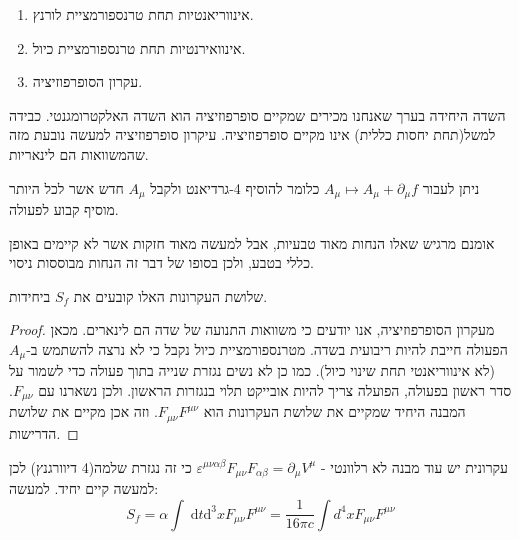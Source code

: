 \documentclass{tstextbook}
\begin{document}
\begin{enumerate}
  \item אינווריאנטיות תחת טרנספורמציית לורנץ. 


  \item אינוואירנטיות תחת טרנספורמציית כיול. 


  \item עקרון הסופרפוזיציה.  


\end{enumerate}
\begin{remark}
השדה היחידה בערך שאנחנו מכירים שמקיים סופרפוזיציה הוא השדה האלקטרומגנטי. כבידה למשל(תחת יחסות כללית) אינו מקיים סופרפוזיציה. עיקרון סופרפוזיציה למעשה נובעת מזה שהמשוואות הם לינאריות.

\end{remark}
\begin{definition}
ניתן לעבור \(A_{\mu}\mapsto A_{\mu}+\partial_{\mu}f\) כלומר להוסיף 4-גרדיאנט ולקבל \(A_{\mu}\) חדש אשר לכל היותר מוסיף קבוע לפעולה.

\end{definition}
אומנם מרגיש שאלו הנחות מאוד טבעיות, אבל למעשה מאוד חזקות אשר לא קיימים באופן כללי בטבע, ולכן בסופו של דבר זה הנחות מבוססות ניסוי.

\begin{proposition}
שלושת העקרונות האלו קובעים את \(S_{f}\) ביחידות.

\end{proposition}
\begin{proof}
מעקרון הסופרפוזיציה, אנו יודעים כי משוואות התנועה של שדה הם לינארים. מכאן הפעולה חייבת להיות ריבועית בשדה. 
מטרנספורמציית כיול נקבל כי לא נרצה להשתמש ב-\(A_{\mu}\)(לא אינווריאנטי תחת שינוי כיול).
כמו כן לא נשים נגזרת שנייה בתוך פעולה כדי לשמור על סדר ראשון בפעולה, הפועלה צריך להיות אובייקט תלוי בנגזרות הראשון. ולכן נשארנו עם \(F_{\mu \nu}\). 
המבנה היחיד שמקיים את שלושת העקרונות הוא \(F_{\mu \nu}F^{\mu \nu}\). וזה אכן מקיים את שלושת הדרישות. 

\end{proof}
עקרונית יש עוד מבנה לא רלוונטי - \(\varepsilon^{\mu \nu \alpha \beta}F_{\mu \nu}F_{\alpha \beta}=\partial_{\mu}V^\mu\) כי זה נגזרת שלמה(4 דיוורגנץ)
לכן למעשה קיים יחיד. למעשה:
$$S_{f}=\alpha\int \;\mathrm{d}t\mathrm{d}^3xF_{\mu \nu}F^{\mu \nu}=\frac{1}{16\pi c}\int d^4x F_{\mu \nu}F^{\mu \nu}$$
\end{document}
